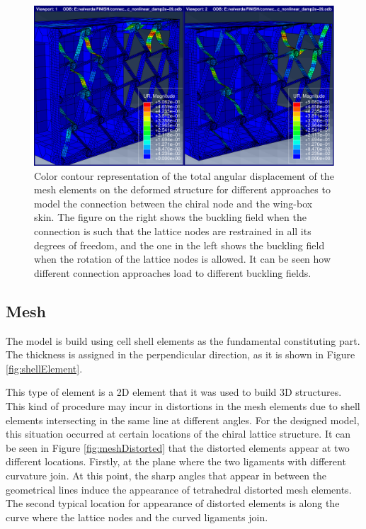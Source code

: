     \begin{figure}[!htpb]
      \centering
      \includegraphics[width=0.8 \textwidth]{figures/further/connectionUR3}
      \caption[Color contour representation of the total angular displacement of the mesh elements on the deformed structure for different approaches to model the connection between the chiral node and the wing-box skin]{Color contour representation of the total angular displacement of the mesh elements on the deformed structure for different approaches to model the connection between the chiral node and the wing-box skin. The figure on the right shows the buckling field when the connection is such that the lattice nodes are restrained in all its degrees of freedom, and the one in the left shows the buckling field when the rotation of the lattice nodes is allowed. It can be seen how different connection approaches load to different buckling fields.}
      \label{fig:connectionUR3}
    \end{figure}

  \clearpage
  \subsection{Mesh} \label{subsec:mesh_results_model}

    The model is build using cell shell elements as the fundamental constituting part. The thickness is assigned in the perpendicular direction, as it is shown in Figure \ref{fig:shellElement}.

    This type of element is a 2D element that it was used to build 3D structures. This kind of procedure may incur in distortions in the mesh elements due to shell elements intersecting in the same line at different angles. For the designed model, this situation occurred at certain locations of the chiral lattice structure. It can be seen in Figure \ref{fig:meshDistorted} that the distorted elements appear at two different locations. Firstly, at the plane where the two ligaments with different curvature join. At this point, the sharp angles that appear in between the geometrical lines induce the appearance of tetrahedral distorted mesh elements. The second typical location for appearance of distorted elements is along the curve where the lattice nodes and the curved ligaments join.

